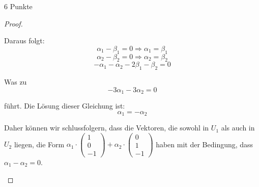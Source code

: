 \documentclass{problemset}
\begin{document}
\begin{problem}{6 Punkte}
\begin{proof}
\begin{enumerate}
              Daraus folgt:
              \[
                  \alpha_1 - \beta_1 = 0 \Rightarrow \alpha_1 = \beta_1
              \]
              \[
                  \alpha_2 - \beta_2 = 0 \Rightarrow \alpha_2 = \beta_2
              \]
              \[
                  -\alpha_1 - \alpha_2 - 2\beta_1 - \beta_2 = 0
              \]

              Was zu
              \[
                  -3\alpha_1 -3\alpha_2 = 0
              \]

              führt. Die Lösung dieser Gleichung ist:
              \[
                  \alpha_1 = -\alpha_2
              \]

              Daher können wir schlussfolgern, dass die Vektoren, die sowohl in
              \(U_1\) als auch in \(U_2\) liegen, die Form \(\alpha_1 \cdot \begin{pmatrix}
                  1 \\
                  0 \\
                  -1
              \end{pmatrix} + \alpha_2 \cdot \begin{pmatrix}
                  0 \\
                  1 \\
                  -1
              \end{pmatrix}\) haben mit der Bedingung, dass \(\alpha_1 - \alpha_2 = 0\).
    \end{enumerate}
\end{proof}
\end{problem}
\end{document}
